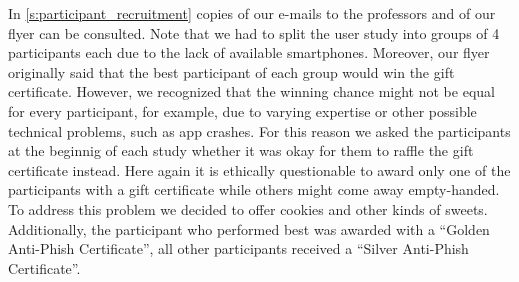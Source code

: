 In \autoref{s:participant_recruitment} copies of our e-mails to the professors and of our flyer can be consulted.
Note that we had to split the user study into groups of 4 participants each due to the lack of available smartphones.
Moreover, our flyer originally said that the best participant of each group would win the gift certificate.
However, we recognized that the winning chance might not be equal for every participant, for example, due to varying expertise or other possible technical problems, such as app crashes.
For this reason we asked the participants at the beginnig of each study whether it was okay for them to raffle the gift certificate instead.
Here again it is ethically questionable to award only one of the participants with a gift certificate while others might come away empty-handed.
To address this problem we decided to offer cookies and other kinds of sweets.
Additionally, the participant who performed best was awarded with a ``Golden Anti-Phish Certificate'', all other participants received a ``Silver Anti-Phish Certificate''.

